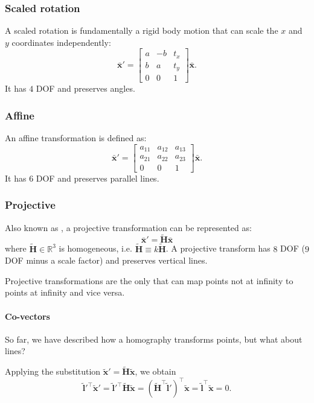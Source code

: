 \subsubsection{Scaled rotation}
A scaled rotation is fundamentally a rigid body motion that can scale the $x$ and $y$ coordinates independently:
$$\bar{\mathbf{x}}'=\begin{bmatrix}
a & -b & t_{x} \\
b & a & t_{y} \\
0 & 0 & 1
\end{bmatrix}\bar{\mathbf{x}}.$$
It has $4$ DOF and preserves angles.

\subsubsection{Affine}
An affine transformation is defined as:
$$\bar{\mathbf{x}}'=\begin{bmatrix}
a_{11} & a_{12} & a_{13} \\
a_{21} & a_{22} & a_{23} \\
0 & 0 & 1
\end{bmatrix}\bar{\mathbf{x}}.$$
It has $6$ DOF and preserves parallel lines.

\subsubsection{Projective}
Also known as , a projective transformation can be represented as:$$\bar{\mathbf{x}}'=\tilde{\mathbf{H}}\bar{\mathbf{x}}$$
where $\tilde{\mathbf{H}}\in \mathbb{R}^3$ is homogeneous, i.e. $\tilde{\mathbf{H}}\equiv k\tilde{\mathbf{H}}$.
A projective transform has $8$ DOF ($9$ DOF minus a scale factor) and preserves vertical lines.

Projective transformations are the only that can map points not at infinity to points at infinity and vice versa.

\paragraph{Co-vectors}
So far, we have described how a homography transforms points, but what about lines?

Applying the substitution $\tilde{\mathbf{x}}'=\tilde{\mathbf{H}}\tilde{\mathbf{x}}$, we obtain
$$\tilde{\mathbf{l}}'^{\top}\tilde{\mathbf{x}}'=\tilde{\mathbf{l}}'^{\top}\tilde{\mathbf{H}}\tilde{\mathbf{x}}=(\tilde{\mathbf{H}}^{\top}\tilde{\mathbf{l}}')^{\top}\tilde{\mathbf{x}}=\tilde{\mathbf{l}}^{\top}\tilde{\mathbf{x}}=0.$$

